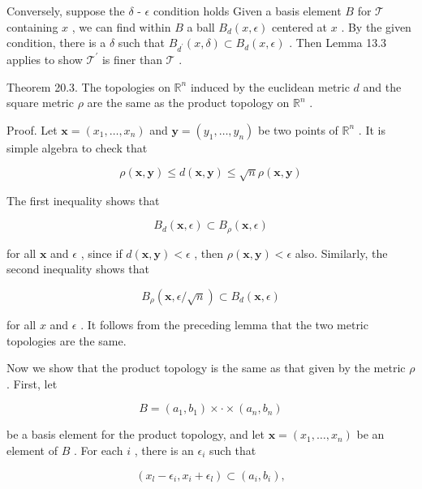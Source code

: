Conversely, suppose the \(\delta\) - \(\epsilon\) condition holds Given a basis element \(B\) for \(\mathcal{T}\) containing \(x\) , we can find within \(B\) a ball \({B}_{d}\left( {x,\epsilon }\right)\) centered at \(x\) . By the given condition, there is a \(\delta\) such that \({B}_{{d}^{\prime }}\left( {x,\delta }\right)  \subset  {B}_{d}\left( {x,\epsilon }\right)\) . Then Lemma 13.3 applies to show \({\mathcal{T}}^{\prime }\) is finer than \(\mathcal{T}\) .

Theorem 20.3. The topologies on \({\mathbb{R}}^{n}\) induced by the euclidean metric \(d\) and the square metric \(\rho\) are the same as the product topology on \({\mathbb{R}}^{n}\) .

Proof. Let \(\mathbf{x} = \left( {{x}_{1},\ldots ,{x}_{n}}\right)\) and \(\mathbf{y} = \left( {{y}_{1},\ldots ,{y}_{n}}\right)\) be two points of \({\mathbb{R}}^{n}\) . It is simple algebra to check that

\[
\rho \left( {\mathbf{x},\mathbf{y}}\right)  \leq  d\left( {\mathbf{x},\mathbf{y}}\right)  \leq  \sqrt{n}\rho \left( {\mathbf{x},\mathbf{y}}\right)
\]

The first inequality shows that

\[
{B}_{d}\left( {\mathbf{x},\epsilon }\right)  \subset  {B}_{\rho }\left( {\mathbf{x},\epsilon }\right)
\]

for all \(\mathbf{x}\) and \(\epsilon\) , since if \(d\left( {\mathbf{x},\mathbf{y}}\right)  < \epsilon\) , then \(\rho \left( {\mathbf{x},\mathbf{y}}\right)  < \epsilon\) also. Similarly, the second inequality shows that

\[
{B}_{\rho }\left( {\mathbf{x},\epsilon /\sqrt{n}}\right)  \subset  {B}_{d}\left( {\mathbf{x},\epsilon }\right)
\]

for all \(x\) and \(\epsilon\) . It follows from the preceding lemma that the two metric topologies are the same.

Now we show that the product topology is the same as that given by the metric \(\rho\) . First, let

\[
B = \left( {{a}_{1},{b}_{1}}\right)  \times   \cdot   \times  \left( {{a}_{n},{b}_{n}}\right)
\]

be a basis element for the product topology, and let \(\mathbf{x} = \left( {{x}_{1},\ldots ,{x}_{n}}\right)\) be an element of \(B\) . For each \(i\) , there is an \({\epsilon }_{i}\) such that

\[
\left( {{x}_{l} - {\epsilon }_{i},{x}_{i} + {\epsilon }_{l}}\right)  \subset  \left( {{a}_{i},{b}_{i}}\right) ,
\]

